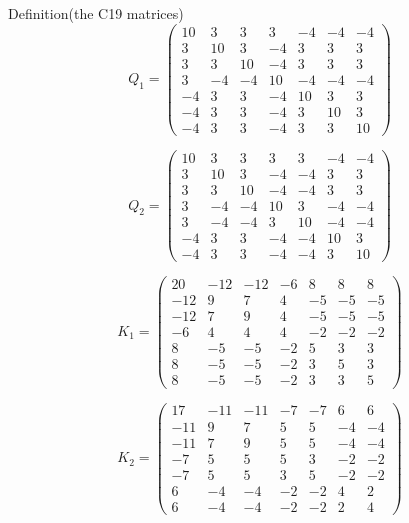 \begin{mergedproofsection}
\begin{namedresult}{Definition}{(the C19 matrices)}
\[
 Q_1=
 \begin{pmatrix}
 10&3&3&3&-4&-4&-4\\
 3&10&3&-4&3&3&3\\
 3&3&10&-4&3&3&3\\
 3&-4&-4&10&-4&-4&-4\\
 -4&3&3&-4&10&3&3\\
 -4&3&3&-4&3&10&3\\
 -4&3&3&-4&3&3&10
 \end{pmatrix}
\]

\[
 Q_2=
 \begin{pmatrix}
 10&3&3&3&3&-4&-4\\
 3&10&3&-4&-4&3&3\\
 3&3&10&-4&-4&3&3\\
 3&-4&-4&10&3&-4&-4\\
 3&-4&-4&3&10&-4&-4\\
 -4&3&3&-4&-4&10&3\\
 -4&3&3&-4&-4&3&10
 \end{pmatrix}
\]

\[
 K_1=
 \begin{pmatrix}
 20&-12&-12&-6&8&8&8\\
 -12&9&7&4&-5&-5&-5\\
 -12&7&9&4&-5&-5&-5\\
 -6&4&4&4&-2&-2&-2\\
 8&-5&-5&-2&5&3&3\\
 8&-5&-5&-2&3&5&3\\
 8&-5&-5&-2&3&3&5
 \end{pmatrix}
\]

\[
 K_2=
 \begin{pmatrix}
 17&-11&-11&-7&-7&6&6\\
 -11&9&7&5&5&-4&-4\\
 -11&7&9&5&5&-4&-4\\
 -7&5&5&5&3&-2&-2\\
 -7&5&5&3&5&-2&-2\\
 6&-4&-4&-2&-2&4&2\\
 6&-4&-4&-2&-2&2&4
 \end{pmatrix}
\]
\end{namedresult}


\end{mergedproofsection}
